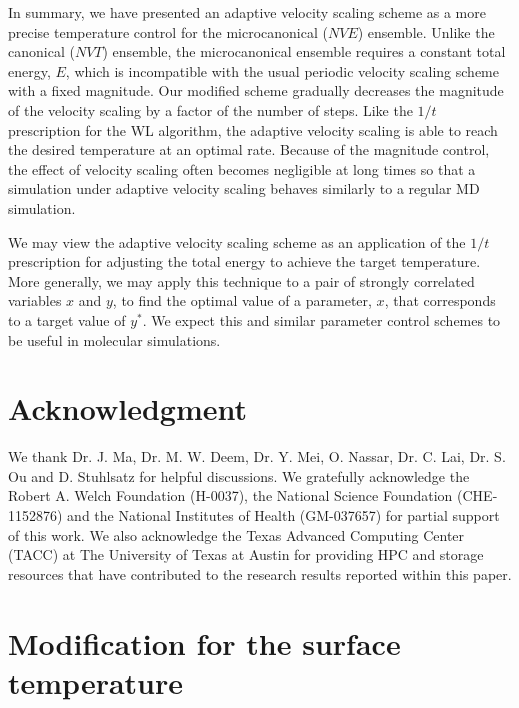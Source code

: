 \documentclass[reprint]{revtex4-1}
\begin{document}
In summary, we have presented an adaptive velocity scaling scheme
as a more precise temperature control for the microcanonical ($NVE$) ensemble.
%
Unlike the canonical ($NVT$) ensemble,
the microcanonical ensemble requires a constant total energy, $E$,
which is incompatible with the usual periodic velocity scaling scheme
with a fixed magnitude.
%
Our modified scheme gradually decreases the magnitude of the velocity scaling
by a factor of the number of steps.
%
Like the $1/t$ prescription\cite{
  belardinelli2007, *belardinelli2007jcp, *belardinelli2008,
  zhou2005, *zhou2008, *morozov2007}
for the WL algorithm\cite{wang2001, *wang2001pre},
the adaptive velocity scaling is able to reach
the desired temperature at an optimal rate.
%
Because of the magnitude control,
the effect of velocity scaling often becomes negligible
at long times so that
a simulation under adaptive velocity scaling
behaves similarly to a regular MD simulation.

We may view the adaptive velocity scaling scheme
as an application of the $1/t$ prescription
for adjusting the total energy
to achieve the target temperature.
%
More generally, we may apply this technique
to a pair of strongly correlated variables $x$ and $y$,
to find the optimal value of a parameter, $x$,
that corresponds to a target value of $y^*$.
%
We expect this and similar parameter control schemes
to be useful in molecular simulations.




\section{Acknowledgment}

We thank Dr. J. Ma, Dr. M. W. Deem, Dr. Y. Mei,
O. Nassar, Dr. C. Lai, Dr. S. Ou and D. Stuhlsatz
for helpful discussions.
We gratefully acknowledge the Robert A. Welch Foundation (H-0037),
the National Science Foundation (CHE-1152876)
and
the National Institutes of Health (GM-037657) for partial support of this work.
%
We also acknowledge the Texas Advanced Computing Center (TACC) at The University of Texas
at Austin for providing HPC and storage resources that have contributed to
the research results reported within this paper.

\appendix






\section{\label{sec:Tsurf}
Modification for the surface temperature}
\end{document}
